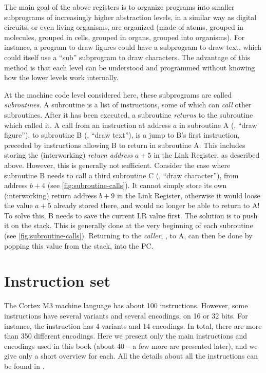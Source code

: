 The main goal of the above registers is to organize programs into smaller
subprograms of increasingly higher abstraction levels, in a similar way as
digital circuits, or even living organisms, are organized (made of atoms,
grouped in molecules, grouped in cells, grouped in organs, grouped into
organisms). For instance, a program to draw figures could have a subprogram to
draw text, which could itself use a ``sub'' subprogram to draw characters. The
advantage of this method is that each level can be understood and
programmed without knowing how the lower levels work internally.

At the machine code level considered here, these subprograms are called {\em
subroutines}. A subroutine is a list of instructions, some of which can {\em
call} other subroutines. After it has been executed, a subroutine {\em returns}
to the subroutine which called it. A call from an instruction at address $a$ in
subroutine A (\eg, ``draw figure''), to subroutine B (\eg, ``draw text''), is a
jump to B's first instruction, preceded by instructions allowing B to return in
subroutine A. This includes storing the (interworking) {\em return address}
$a+5$ in the Link Register, as described above. However, this is generally not
sufficient. Consider the case where subroutine B needs to call a third
subroutine C (\eg, ``draw character''), from address $b+4$ (see
\cref{fig:subroutine-calls}). It cannot simply store its own (interworking)
return address $b+9$ in the Link Register, otherwise it would loose the value
$a+5$ already stored there, and would no longer be able to return to A! To
solve this, B needs to save the current LR value first. The solution is to push
it on the stack. This is generally done at the very beginning of each
subroutine (see \cref{fig:subroutine-calls}). Returning to the {\em caller},
\ie, to A, can then be done by popping this value from the stack, into the PC.

\section{Instruction set}\label{section:instruction-set}

The Cortex M3 machine language has about 100 instructions. However, some
instructions have several variants and several encodings, on 16 or 32 bits. For
instance, the  instruction has 4 variants and 14 encodings. In total,
there are more than 350 different encodings. Here we present only the main
instructions and encodings used in this book (about 40 -- a few more are
presented later), and we give only a short overview for each. All the details
about all the instructions can be found in \cite{ARMv7}.

